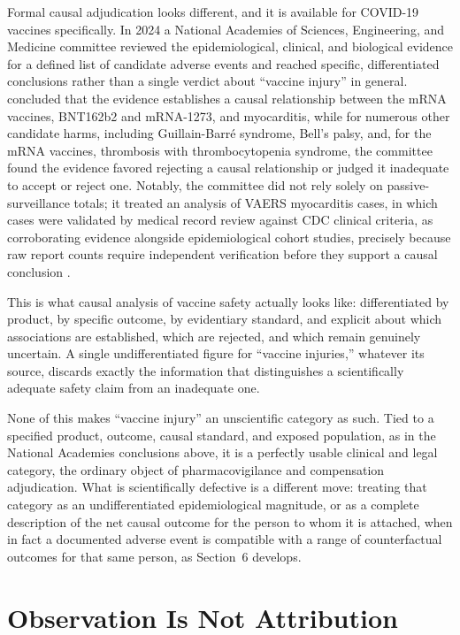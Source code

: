 \documentclass[11pt]{article}
\begin{document}
Formal causal adjudication looks different, and it is available for COVID-19 vaccines specifically. In 2024 a National Academies of Sciences, Engineering, and Medicine committee reviewed the epidemiological, clinical, and biological evidence for a defined list of candidate adverse events and reached specific, differentiated conclusions rather than a single verdict about ``vaccine injury'' in general. \citet{nasem2024} concluded that the evidence establishes a causal relationship between the mRNA vaccines, BNT162b2 and mRNA-1273, and myocarditis, while for numerous other candidate harms, including Guillain-Barr\'e syndrome, Bell's palsy, and, for the mRNA vaccines, thrombosis with thrombocytopenia syndrome, the committee found the evidence favored rejecting a causal relationship or judged it inadequate to accept or reject one. Notably, the committee did not rely solely on passive-surveillance totals; it treated an analysis of VAERS myocarditis cases, in which cases were validated by medical record review against CDC clinical criteria, as corroborating evidence alongside epidemiological cohort studies, precisely because raw report counts require independent verification before they support a causal conclusion \citep{nasem2024}.

This is what causal analysis of vaccine safety actually looks like: differentiated by product, by specific outcome, by evidentiary standard, and explicit about which associations are established, which are rejected, and which remain genuinely uncertain. A single undifferentiated figure for ``vaccine injuries,'' whatever its source, discards exactly the information that distinguishes a scientifically adequate safety claim from an inadequate one.

None of this makes ``vaccine injury'' an unscientific category as such. Tied to a specified product, outcome, causal standard, and exposed population, as in the National Academies conclusions above, it is a perfectly usable clinical and legal category, the ordinary object of pharmacovigilance and compensation adjudication. What is scientifically defective is a different move: treating that category as an undifferentiated epidemiological magnitude, or as a complete description of the net causal outcome for the person to whom it is attached, when in fact a documented adverse event is compatible with a range of counterfactual outcomes for that same person, as Section~6 develops.

\section{Observation Is Not Attribution}
\end{document}

